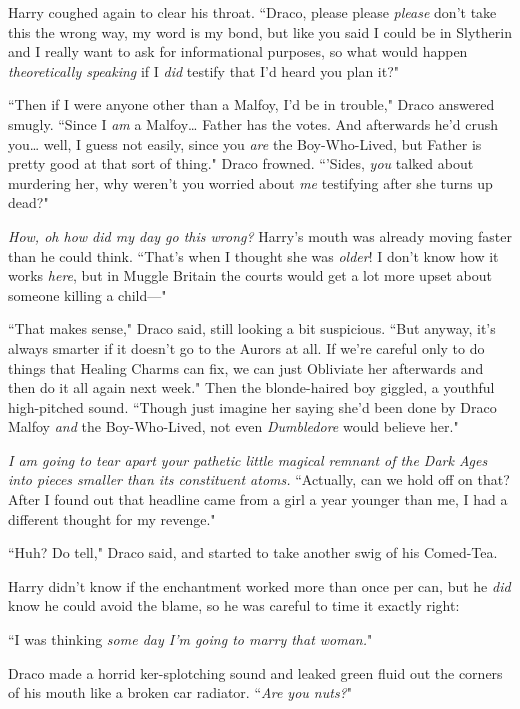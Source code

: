Harry coughed again to clear his throat. ``Draco, please please \emph{please} don't take this the wrong way, my word is my bond, but like you said I could be in Slytherin and I really want to ask for informational purposes, so what would happen \emph{theoretically speaking} if I \emph{did} testify that I'd heard you plan it?"

``Then if I were anyone other than a Malfoy, I'd be in trouble," Draco answered smugly. ``Since I \emph{am} a Malfoy{\ldots} Father has the votes. And afterwards he'd crush you{\ldots} well, I guess not easily, since you \emph{are} the Boy-Who-Lived, but Father is pretty good at that sort of thing." Draco frowned. ``'Sides, \emph{you} talked about murdering her, why weren't you worried about \emph{me} testifying after she turns up dead?"

\emph{How, oh how did my day go this wrong?} Harry's mouth was already moving faster than he could think. ``That's when I thought she was \emph{older}! I don't know how it works \emph{here}, but in Muggle Britain the courts would get a lot more upset about someone killing a child—"

``That makes sense," Draco said, still looking a bit suspicious. ``But anyway, it's always smarter if it doesn't go to the Aurors at all. If we're careful only to do things that Healing Charms can fix, we can just Obliviate her afterwards and then do it all again next week." Then the blonde-haired boy giggled, a youthful high-pitched sound. ``Though just imagine her saying she'd been done by Draco Malfoy \emph{and} the Boy-Who-Lived, not even \emph{Dumbledore} would believe her."

\emph{I am going to tear apart your pathetic little magical remnant of the Dark Ages into pieces smaller than its constituent atoms.} ``Actually, can we hold off on that? After I found out that headline came from a girl a year younger than me, I had a different thought for my revenge."

``Huh? Do tell," Draco said, and started to take another swig of his Comed-Tea.

Harry didn't know if the enchantment worked more than once per can, but he \emph{did} know he could avoid the blame, so he was careful to time it exactly right:

``I was thinking \emph{some day I'm going to marry that woman.}"

Draco made a horrid ker-splotching sound and leaked green fluid out the corners of his mouth like a broken car radiator. ``\emph{Are you nuts?}"

